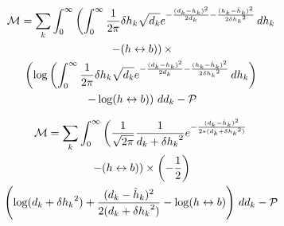 \documentclass[twocolumn,twoside,prd]{revtex4} %
\newif\ifJASA \JASAfalse
\newcommand {\expBK}[1]{e^{#1}}
\begin{document}
\begin{multline}
\label{eqn:SimplifyM1}
{\cal M} = \sum_k \int_0^\infty{ \left( \int_0^\infty{ \frac{1}{2\pi}{\delta h_k}{\sqrt{d_k}} \expBK{- \frac{( d_k -  h_k )^2}{ 2{d_k}} - \frac{( h_k - \hat h_k )^2} {2 {\delta h_k}^2} }  \, dh_k} \right. } \\
{\left. - (h \leftrightarrow b) \right) \times } \\
{ \left(\log \left( \int_0^\infty{ \frac{1}{2\pi}{\delta h_k}{\sqrt{d_k}}\expBK{- \frac{( d_k -  h_k )^2} {2 {d_k}} - \frac{( h_k - \hat h_k )^2} {2 {\delta h_k}^2} }  \, dh_k} \right) \right. } \\
{ \left.  - \log( h \leftrightarrow b  )\right) \, dd_k} - {\cal P} \\
\end{multline}

\ifJASA
\begin{multline}
\label{eqn:SimplifyM2}
{\cal M} = \sum_k \int_0^\infty{  (\frac{1}{\sqrt{2\pi}}  \frac{1}{{d_k} + {\delta h_k}^2}  \expBK{- \frac {( d_k -  \hat h_k )^2} {2*({d_k} + {\delta h_k}^2)}} - ( h \leftrightarrow b)) \times (-\frac{1}{2}) (\log({d_k} + {\delta h_k}^2)  + \frac {( d_k -  \hat h_k )^2}{2*({d_k} + {\delta h_k}^2)} - \log( h \leftrightarrow b  )) \, dd_k} - {\cal P} \\
\end{multline}
\else
\begin{multline}
\label{eqn:SimplifyM2}
{\cal M} = \sum_k \int_0^\infty{  \left(\frac{1}{\sqrt{2\pi}}  \frac{1}{{d_k} + {\delta h_k}^2}  \expBK{- \frac {( d_k -  \hat h_k )^2} {2*({d_k} + {\delta h_k}^2)} }  \right. }  \\   
{ \left.   - ( h \leftrightarrow b)\right) \times \left(-\frac{1}{2}\right) } \\
{ \left(\log({d_k} + {\delta h_k}^2)  + \frac {( d_k -  \hat h_k )^2}{2({d_k} + {\delta h_k}^2)} - \log( h \leftrightarrow b  )\right) \, dd_k} - {\cal P} \\
\end{multline}
\fi
\end{document}
